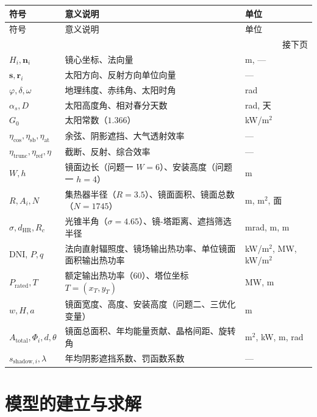 \documentclass[12pt,a4paper,fontset=fandol]{ctexart}
\begin{document}
\renewcommand{\arraystretch}{1.15}
\small
\begin{longtable}{p{}p{}p{}}
    \toprule
    符号 & 意义说明 & 单位 \\
    \midrule
    \endfirsthead
    \toprule
    符号 & 意义说明 & 单位 \\
    \midrule
    \endhead
    \midrule
    \multicolumn{3}{r}{\small 接下页} \\
    \endfoot
    \bottomrule
    \endlastfoot
    $H_i, \mathbf{n}_i$ & 镜心坐标、法向量 & m, — \\
    $\mathbf{s}, \mathbf{r}_i$ & 太阳方向、反射方向单位向量 & — \\
    $\varphi, \delta, \omega$ & 地理纬度、赤纬角、太阳时角 & rad \\
    $\alpha_s, D$ & 太阳高度角、相对春分天数 & rad, 天 \\
    $G_0$ & 太阳常数（$1.366$） & kW/m$^{2}$ \\
    $\eta_{\mathrm{cos}}, \eta_{\mathrm{sb}}, \eta_{\mathrm{at}}$ & 余弦、阴影遮挡、大气透射效率 & — \\
    $\eta_{\mathrm{trunc}}, \eta_{\mathrm{ref}}, \eta$ & 截断、反射、综合效率 & — \\
    $W, h$ & 镜面边长（问题一 $W=6$）、安装高度（问题一 $h=4$） & m \\
    $R, A_i, N$ & 集热器半径（$R=3.5$）、镜面面积、镜面总数（$N=1745$） & m, m$^{2}$, 面 \\
    $\sigma, d_{\mathrm{HR}}, R_c$ & 光锥半角（$\sigma=4.65$）、镜-塔距离、遮挡筛选半径 & mrad, m, m \\
    DNI, $P, q$ & 法向直射辐照度、镜场输出热功率、单位镜面面积输出热功率 & kW/m$^{2}$, MW, kW/m$^{2}$ \\
    $P_{\mathrm{rated}}, T$ & 额定输出热功率（$60$）、塔位坐标 $T=(x_T,y_T)$ & MW, m \\
    $w, H, a$ & 镜面宽度、高度、安装高度（问题二、三优化变量） & m \\
    $A_{\mathrm{total}}, \Phi_i, d, \theta$ & 镜面总面积、年均能量贡献、晶格间距、旋转角 & m$^{2}$, kW, m, rad \\
    $s_{\mathrm{shadow},i}, \lambda$ & 年均阴影遮挡系数、罚函数系数 & ---
\end{longtable}

\section{模型的建立与求解}
\end{document}
